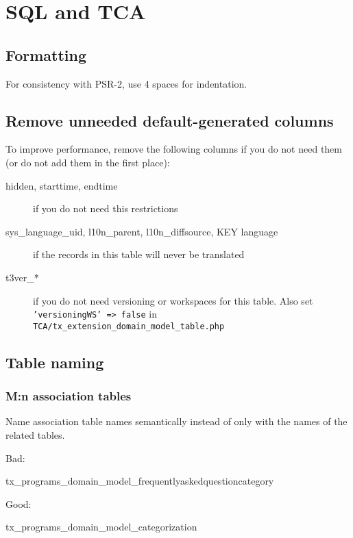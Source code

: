 \chapter{SQL and TCA}

\section{Formatting}
For consistency with PSR-2, use 4 spaces for indentation.

\section{Remove unneeded default-generated columns}

To improve performance, remove the following columns if you do not need them (or do not add them in the first place):

\begin{description}
  \item[hidden, starttime, endtime] if you do not need this restrictions
  \item[sys\_language\_uid, l10n\_parent, l10n\_diffsource, KEY language] if the records in this table will never be translated
  \item[t3ver\_*] if you do not need versioning or workspaces for this table. Also set \texttt{'versioningWS' => false} in \texttt{TCA/tx\_extension\_domain\_model\_table.php}
\end{description}


\section{Table naming}

\subsection{M:n association tables}

Name association table names semantically instead of only with the names of the related tables.

Bad:

\begin{sqlcode}
tx_programs_domain_model_frequentlyaskedquestioncategory
\end{sqlcode}

Good:

\begin{sqlcode}
tx_programs_domain_model_categorization
\end{sqlcode}


